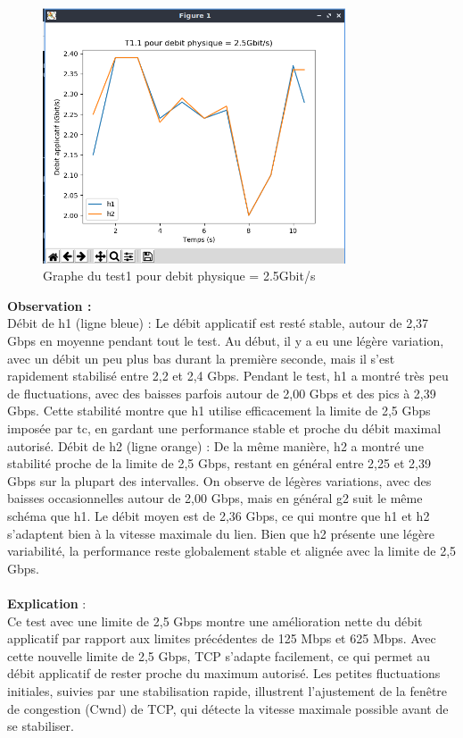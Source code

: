 \begin{figure}[H]
    \centering
    \includegraphics[width=0.8\textwidth]{./images/T1.1/courbe2500test1.png}
    \caption{Graphe du test1 pour debit physique = 2.5Gbit/s}
    \label{fig:exemple}
\end{figure}
\newpage
\textbf{Observation :}\\
Débit de h1 (ligne bleue) :  Le débit applicatif est resté stable, autour de 2,37 Gbps en moyenne pendant tout le test. Au début, il y a eu une légère variation, avec un débit un peu plus bas durant la première seconde, mais il s’est rapidement stabilisé entre 2,2 et 2,4 Gbps. Pendant le test, h1 a montré très peu de fluctuations, avec des baisses parfois autour de 2,00 Gbps et des pics à 2,39 Gbps. Cette stabilité montre que h1 utilise efficacement la limite de 2,5 Gbps imposée par tc, en gardant une performance stable et proche du débit maximal autorisé.
Débit de h2 (ligne orange) : De la même manière, h2 a montré une stabilité proche de la limite de 2,5 Gbps, restant en général entre 2,25 et 2,39 Gbps sur la plupart des intervalles. On observe de légères variations, avec des baisses occasionnelles autour de 2,00 Gbps, mais en général g2 suit le même schéma que h1. Le débit moyen est de 2,36 Gbps, ce qui montre que h1 et h2 s’adaptent bien à la vitesse maximale du lien. Bien que h2 présente une légère variabilité, la performance reste globalement stable et alignée avec la limite de 2,5 Gbps.
\\
\\
\textbf{Explication} :\\
Ce test avec une limite de 2,5 Gbps montre une amélioration nette du débit applicatif par rapport aux limites précédentes de 125 Mbps et 625 Mbps. Avec cette nouvelle limite de 2,5 Gbps, TCP s’adapte facilement, ce qui permet au débit applicatif de rester proche du maximum autorisé. Les petites fluctuations initiales, suivies par une stabilisation rapide, illustrent l’ajustement de la fenêtre de congestion (Cwnd) de TCP, qui détecte la vitesse maximale possible avant de se stabiliser.

